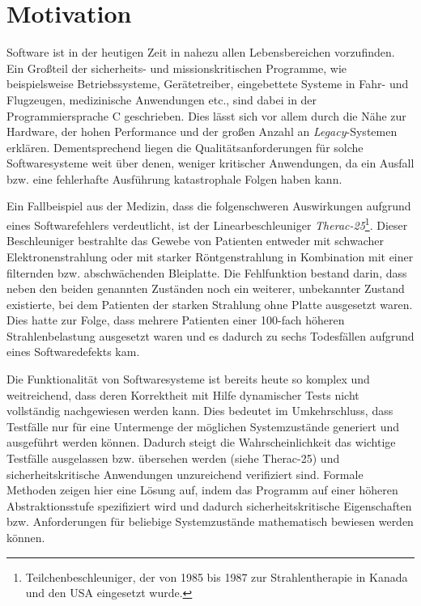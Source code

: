 \section{Motivation}

Software ist in der heutigen Zeit in nahezu allen Lebensbereichen vorzufinden. Ein Großteil der sicherheits- und missionskritischen Programme, wie beispielsweise Betriebssysteme, Gerätetreiber, eingebettete Systeme in Fahr- und Flugzeugen, medizinische Anwendungen etc.,  sind dabei in der Programmiersprache C geschrieben. Dies lässt sich vor allem durch die Nähe zur Hardware, der hohen Performance und der großen Anzahl an \emph{Legacy}-Systemen erklären. Dementsprechend liegen die Qualitätsanforderungen für solche Softwaresysteme weit über denen, weniger kritischer Anwendungen, da ein Ausfall bzw. eine fehlerhafte Ausführung katastrophale Folgen haben kann.

Ein Fallbeispiel aus der Medizin, dass die folgenschweren Auswirkungen aufgrund eines Softwarefehlers verdeutlicht, ist der Linearbeschleuniger \emph{Therac-25}\footnote{Teilchenbeschleuniger, der von 1985 bis 1987 zur Strahlentherapie in Kanada und den USA eingesetzt wurde.}. Dieser Beschleuniger bestrahlte das Gewebe von Patienten entweder mit schwacher Elektronenstrahlung oder mit starker Röntgenstrahlung in Kombination mit einer filternden bzw. abschwächenden Bleiplatte. Die Fehlfunktion bestand darin, dass neben den beiden genannten Zuständen noch ein weiterer, unbekannter Zustand existierte, bei dem Patienten der starken Strahlung ohne Platte ausgesetzt waren. Dies hatte zur Folge, dass mehrere Patienten einer 100-fach höheren Strahlenbelastung ausgesetzt waren und es dadurch zu sechs Todesfällen aufgrund eines Softwaredefekts kam. \cite{Pfeifer2003}

Die Funktionalität von Softwaresysteme ist bereits heute so komplex und weitreichend, dass deren Korrektheit mit Hilfe dynamischer Tests nicht vollständig nachgewiesen werden kann. Dies bedeutet im Umkehrschluss, dass Testfälle nur für eine Untermenge der möglichen Systemzustände generiert und ausgeführt werden können. Dadurch steigt die Wahrscheinlichkeit das wichtige Testfälle ausgelassen bzw. übersehen werden (siehe Therac-25) und sicherheitskritische Anwendungen unzureichend verifiziert sind. Formale Methoden zeigen hier eine Lösung auf, indem das Programm auf einer höheren Abstraktionsstufe spezifiziert wird und dadurch sicherheitskritische Eigenschaften bzw. Anforderungen für beliebige Systemzustände mathematisch bewiesen werden können. \cite{Crocker2007}
